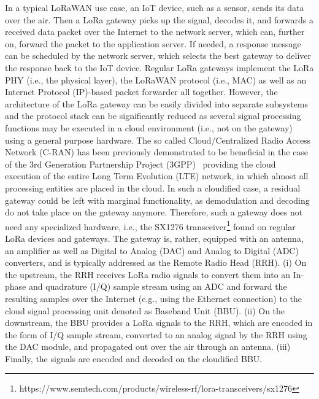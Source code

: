 In a typical LoRaWAN use case, an IoT device, such as a sensor, sends its data over the air. 
Then a LoRa gateway picks up the signal, decodes it, and forwards a received data packet over the Internet to the network server, which can, further on, forward the packet to the application server. 
If needed, a response message can be scheduled by the network server, which selects the best gateway to deliver the response back to the IoT device.
Regular LoRa gateways implement the LoRa PHY (i.e., the physical layer), the LoRaWAN protocol (i.e., MAC) as well as an Internet Protocol (IP)-based packet forwarder all together.
However, the architecture of the LoRa gateway can be easily divided into separate subsystems and the protocol stack can be significantly reduced as several signal processing functions may be executed in a cloud environment (i.e., not on the gateway) using a general purpose hardware. 
The so called Cloud/Centralized Radio Access Network (C-RAN) has been previously demonstrated to be beneficial in the case of the 3rd Generation Partnership Project (3GPP)~\cite{Sousa2016} providing the cloud execution of the entire Long Term Evolution (LTE) network, in which almost all processing entities are placed in the cloud. 
In such a cloudified case, a residual gateway could be left with marginal functionality, as demodulation and decoding do not take place on the gateway anymore.
Therefore, such a gateway does not need any specialized hardware, i.e., the SX1276 transceiver\footnote{https://www.semtech.com/products/wireless-rf/lora-transceivers/sx1276} found on regular LoRa devices and gateways. 
The gateway is, rather, equipped with an antenna, an amplifier as well as Digital to Analog (DAC) and Analog to Digital (ADC) converters, and is typically addressed as the Remote Radio Head (RRH). 
(i) On the upstream, the RRH receives LoRa radio signals to convert them into an In-phase and quadrature (I/Q) sample stream using an ADC and forward the resulting samples over the Internet (e.g., using the Ethernet connection) to the cloud signal processing unit denoted as Baseband Unit (BBU). 
(ii) On the downstream, the BBU provides a LoRa signals to the RRH, which are encoded in the form of I/Q sample stream, converted to an analog signal by the RRH using the DAC module, and propagated out over the air through an antenna.
(iii) Finally, the signals are encoded and decoded on the cloudified BBU. 

